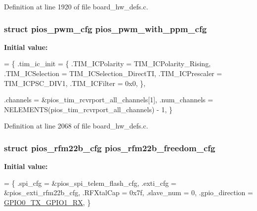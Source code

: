 Definition at line 1920 of file board\-\_\-hw\-\_\-defs.\-c.

\hypertarget{group___tau_labs_core_ga6a7a8338c617f18384f3b3c5678f5505}{
\subsubsection[{pios\-\_\-pwm\-\_\-with\-\_\-ppm\-\_\-cfg}]{\setlength{\rightskip}{0pt plus 5cm}struct {\bf pios\-\_\-pwm\-\_\-cfg} pios\-\_\-pwm\-\_\-with\-\_\-ppm\-\_\-cfg}}\label{group___tau_labs_core_ga6a7a8338c617f18384f3b3c5678f5505}
{\bfseries Initial value\-:}
\begin{DoxyCode}
= \{
        .tim\_ic\_init = \{
                .TIM\_ICPolarity = TIM\_ICPolarity\_Rising,
                .TIM\_ICSelection = TIM\_ICSelection\_DirectTI,
                .TIM\_ICPrescaler = TIM\_ICPSC\_DIV1,
                .TIM\_ICFilter = 0x0,
        \},
        
        .channels = &pios\_tim\_rcvrport\_all\_channels[1],
        .num\_channels = NELEMENTS(pios\_tim\_rcvrport\_all\_channels) - 1,
\}
\end{DoxyCode}


Definition at line 2068 of file board\-\_\-hw\-\_\-defs.\-c.

\hypertarget{group___tau_labs_core_ga90c3bcd6b750abf0c59333f52475d875}{
\subsubsection[{pios\-\_\-rfm22b\-\_\-freedom\-\_\-cfg}]{\setlength{\rightskip}{0pt plus 5cm}struct {\bf pios\-\_\-rfm22b\-\_\-cfg} pios\-\_\-rfm22b\-\_\-freedom\-\_\-cfg}}\label{group___tau_labs_core_ga90c3bcd6b750abf0c59333f52475d875}
{\bfseries Initial value\-:}
\begin{DoxyCode}
= \{
        .spi\_cfg = &pios\_spi\_telem\_flash\_cfg,
        .exti\_cfg = &pios\_exti\_rfm22b\_cfg,
        .RFXtalCap = 0x7f,
        .slave\_num = 0,
        .gpio\_direction = \hyperlink{group___p_i_o_s___r_f_m22_b_ggaccc7d029df9e5a96151a68e64f4be7e2a87c92cb693852456c28e74d75b67b00a}{GPIO0\_TX\_GPIO1\_RX},
\}
\end{DoxyCode}


